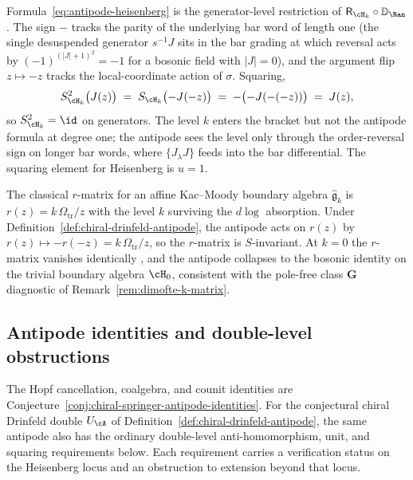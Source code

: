 \begin{remark}
\label{rem:antipode-heisenberg-sanity}
Formula~\eqref{eq:antipode-heisenberg} is the generator-level
restriction of $\mathsf{R}_{\cH_k} \circ \mathbb{D}_{\Ran}$. The
sign $-$ tracks the parity of the underlying bar word of length one
(the single desuspended generator $s^{-1}J$ sits in the bar grading
at which reversal acts by $(-1)^{(|J|+1)^2} = -1$ for a bosonic
field with $|J| = 0$), and the argument flip $z \mapsto -z$ tracks
the local-coordinate action of $\sigma$. Squaring,
\[
S_{\cH_k}^{2}\bigl(J(z)\bigr)
\;=\; S_{\cH_k}\bigl(-J(-z)\bigr)
\;=\; -\bigl(-J(-(-z))\bigr)
\;=\; J(z),
\]
so $S_{\cH_k}^{2} = \id$ on generators. The level $k$ enters the
bracket but not the antipode formula at degree one; the antipode
sees the level only through the order-reversal sign on longer bar
words, where $\{J_\lambda J\}$ feeds into the bar differential.
The squaring element for Heisenberg is $u = 1$.
\end{remark}

\begin{remark}
\label{rem:antipode-r-matrix-check}
The classical $r$-matrix for an affine Kac--Moody boundary algebra
$\widehat{\mathfrak g}_k$ is $r(z) = k\,\Omega_{\mathrm{tr}}/z$ with the level $k$
surviving the $d\log$ absorption. Under
Definition~\ref{def:chiral-drinfeld-antipode}, the antipode acts on
$r(z)$ by $r(z) \mapsto -r(-z) = k\,\Omega_{\mathrm{tr}}/z$, so the $r$-matrix is
$S$-invariant. At $k = 0$ the $r$-matrix vanishes identically
, and the antipode collapses to the bosonic identity
on the trivial boundary algebra $\cH_0$, consistent with the
pole-free class $\mathbf{G}$ diagnostic of
Remark~\ref{rem:dimofte-k-matrix}.
\end{remark}

\subsection{Antipode identities and double-level obstructions}
\label{subsec:antipode-axioms}

The Hopf cancellation, coalgebra, and counit identities are
Conjecture~\ref{conj:chiral-springer-antipode-identities}.  For the
conjectural chiral Drinfeld double \(U_\cA\) of
Definition~\ref{def:chiral-drinfeld-antipode}, the same antipode also
has the ordinary double-level anti-homomorphism, unit, and squaring
requirements below.  Each requirement carries a verification status
on the Heisenberg locus and an obstruction to extension beyond that
locus.

